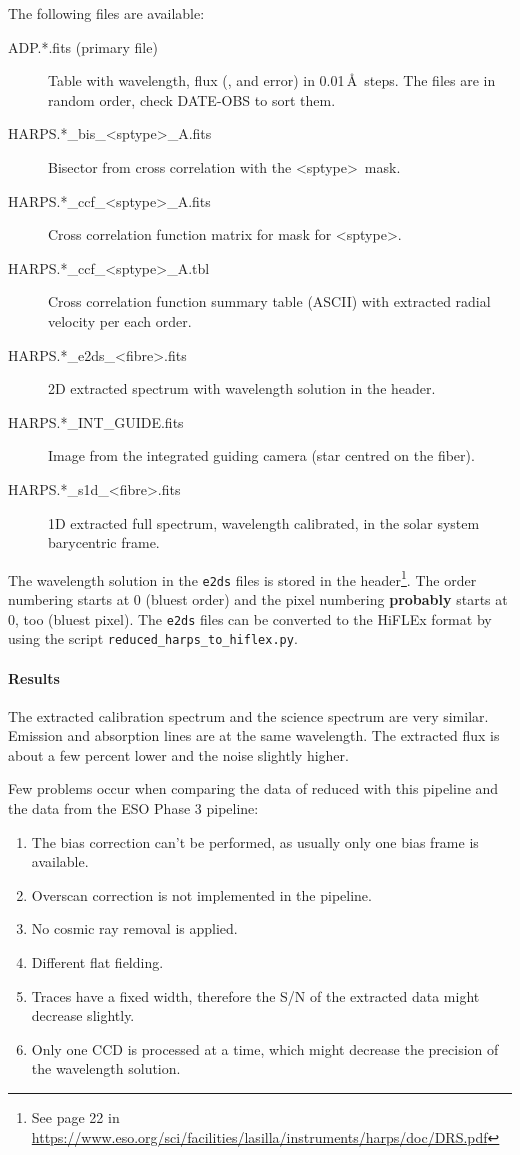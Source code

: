 \documentclass[10pt,a4paper]{article}
\begin{document}
The following files are available:
\begin{description}
  \item[ADP.*.fits (primary file)] Table with wavelength, flux (, and error) in 0.01\,\AA\ steps. The files are in random order, check DATE-OBS to sort them.
  \item[HARPS.*\_bis\_\textless sptype\textgreater\_A.fits] Bisector from cross correlation with the \textless sptype\textgreater\ mask.
  \item[HARPS.*\_ccf\_\textless sptype\textgreater\_A.fits] Cross correlation function matrix for mask for \textless sptype\textgreater.
  \item[HARPS.*\_ccf\_\textless sptype\textgreater\_A.tbl]  Cross correlation function summary table (ASCII) with extracted radial velocity per each order.
  \item[HARPS.*\_e2ds\_\textless fibre\textgreater.fits] 2D extracted spectrum with wavelength solution in the header.
  \item[HARPS.*\_INT\_GUIDE.fits] Image from the integrated guiding camera (star centred on the fiber).
  \item[HARPS.*\_s1d\_\textless fibre\textgreater.fits] 1D extracted full spectrum, wavelength calibrated, in the solar system barycentric frame.
\end{description}

The wavelength solution in the \verb|e2ds| files is stored in the header\footnote{See page 22 in \url{https://www.eso.org/sci/facilities/lasilla/instruments/harps/doc/DRS.pdf}}. The order numbering starts at 0 (bluest order) and the pixel numbering \textbf{probably} starts at 0, too (bluest pixel). The \verb|e2ds| files can be converted to the HiFLEx format by using the script \verb|reduced_harps_to_hiflex.py|.

\paragraph{Results}
The extracted calibration spectrum and the science spectrum are very similar. Emission and absorption lines are at the same wavelength. The extracted flux is about a few percent lower and the noise slightly higher.

Few problems occur when comparing the data of reduced with this pipeline and the data from the ESO Phase 3 pipeline:
\begin{enumerate}\setlength\itemsep{0em}
  \item The bias correction can't be performed, as usually only one bias frame is available.
  \item Overscan correction is not implemented in the pipeline.
  \item No cosmic ray removal is applied.
  \item Different flat fielding.
  \item Traces have a fixed width, therefore the S/N of the extracted data might decrease slightly.
  \item Only one CCD is processed at a time, which might decrease the precision of the wavelength solution.
\end{enumerate}
\end{document}
